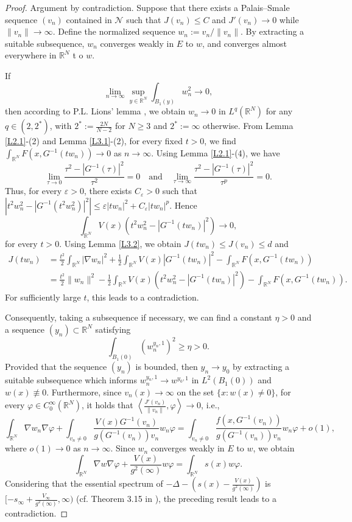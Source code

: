 \documentclass[10pt,a4paper]{amsart}
\numberwithin{equation}{section}
\begin{document}
\begin{proof}
Argument by contradiction. Suppose that there exists a Palais–Smale sequence \((v_n)\) 
contained in \(\mathcal{N}\) such that \(J(v_n)\le C\) and \(J'(v_n)\to0\) while \(\|v_n\|\to\infty\). 
Define the normalized sequence \(w_n := v_n/\|v_n\|\). By extracting a suitable subsequence, 
\(w_n\) converges weakly in \(E\) to  \(w\), and converges almost everywhere in \(\mathbb{R}^N\) t
o $w$.

If
$$
\lim_{n\to\infty}\sup_{y\in{\mathbb{R}^N}}\int_{B_1(y)}w^2_n\to 0,
$$
then according to P.L. Lions' lemma \cite[p.16]{Willem}, 
 we obtain $w_n\to 0$ in $L^q({\mathbb{R}^N})$ for any $q\in (2, 2^*)$, with $2^*:= \frac{2N}{N-2}$ for 
 $N \geq 3$ and $2^* := \infty$ otherwise. 
 From Lemma \ref{L2.1}-(2) and Lemma \ref{L3.1}-(2),  for every fixed  $t>0$, we find 
 $\int_{\mathbb{R}^N}F(x,G^{-1}(t w_n))\to 0$ as $n\to\infty$. Using Lemma \ref{L2.1}-(4), we have
 $$
 \lim_{\tau\to 0}\frac{\tau^2-|G^{-1}(\tau)|^2}{\tau^2}=0\quad \text{and}\quad
 \lim_{\tau\to \infty}\frac{\tau^2-|G^{-1}(\tau)|^2}{\tau^p}=0.
 $$
Thus, for every $\varepsilon>0$, there exists $C_{\varepsilon}>0$ such that 
$\left|t^2w^2_n-|G^{-1}(t^2w^2_n)|^2\right|\leq \varepsilon |tw_n|^2+C_{\varepsilon}|tw_n|^p$. 
Hence $$\int_{\mathbb{R}^N}V(x)\left(t^2w^2_n-|G^{-1}(tw_n)|^2\right)\to 0,$$ for every $t>0$. 
Using Lemma \ref{L3.2}, we obtain $J(tw_n)\leq J(v_n)\leq d$ and
\begin{align*}
 J(tw_n)&= \frac{t^2}{2}\int_{\mathbb{R}^{N}}|\nabla w_n|^{2}
  +\frac{1}{2}\int_{\mathbb{R}^N}V(x)|G^{-1}(tw_n)|^2-\int_{\mathbb{R}^{N}}F(x,G^{-1}(tw_n)) \\
 &= \frac{t^2}{2}\|w_n\|^2-\frac{1}{2}\int_{\mathbb{R}^N}V(x)\left(t^2w^2_n-|G^{-1}(tw_n)|^2\right)
  -\int_{\mathbb{R}^{N}}F(x,G^{-1}(tw_n)).
\end{align*}
For sufficiently large $t$, this leads to a contradiction.

Consequently, taking a subsequence if necessary, we can find a constant $\eta > 0$ and a 
sequence $(y_n) \subset \mathbb{R}^N$ satisfying
$$
\int_{B_1(0)}(w_n^{y_n,1})^2\geq \eta>0.
$$
Provided that the sequence $(y_n)$ is bounded, then  $y_n\to y_0$ by extracting a suitable 
subsequence which informs $w_n^{y_n,1}\to w^{y_0,1}$ in $L^2(B_1(0))$ and 
$w(x) \not\equiv 0$. Furthermore, since $v_n(x) \to \infty$ on the set $\{x: w(x) \neq 0\}$, 
for every $\varphi \in C_0^{\infty}(\mathbb{R}^N)$, it holds that 
$\left\langle \frac{J'(v_n)}{\|v_n\|}, \varphi \right\rangle \to 0$, i.e.,
$$
\int_{\mathbb{R}^N}\nabla w_n\nabla\varphi+\int_{v_n
\neq 0}\frac{V(x)G^{-1}(v_n)}{g(G^{-1}(v_n))v_n}w_n\varphi
=\int_{v_n\neq 0}\frac{f(x,G^{-1}(v_n))}{g(G^{-1}(v_n))v_n}w_n\varphi+o(1),
$$
where $o(1)\to 0$ as $n\to\infty$.
Since \(w_n\) converges weakly in \(E\) to  \(w\), we obtain
$$
\int_{\mathbb{R}^N}\nabla w\nabla\varphi+\frac{V(x)}{g^2(\infty)}w\varphi=\int_{\mathbb{R}^N}s(x)w\varphi.
$$
Considering that the essential spectrum of $-\Delta-\left(s(x)-\frac{V(x)}{g^2(\infty)}\right)$ is 
$[-s_{\infty}+\frac{V_{\infty}}{g^2(\infty)},\infty)$ (cf. Theorem 3.15 in \cite{Stuart}),  
the preceding result leads to a contradiction.


\end{proof}
\end{document}
